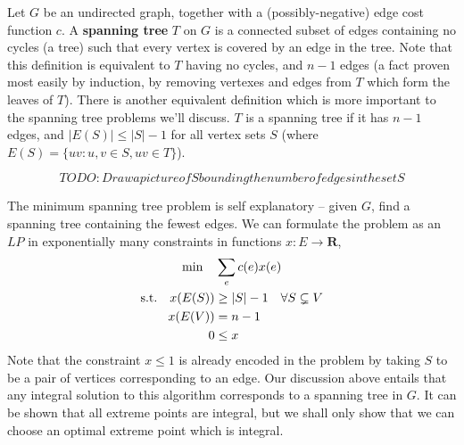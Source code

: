 Let $G$ be an undirected graph, together with a (possibly-negative) edge cost function $c$. A {\bf spanning tree} $T$ on $G$ is a connected subset of edges containing no cycles (a tree) such that every vertex is covered by an edge in the tree. Note that this definition is equivalent to $T$ having no cycles, and $n-1$ edges (a fact proven most easily by induction, by removing vertexes and edges from $T$ which form the leaves of $T$). There is another equivalent definition which is more important to the spanning tree problems we'll discuss. $T$ is a spanning tree if it has $n-1$ edges, and $|E(S)| \leq |S| - 1$ for all vertex sets $S$ (where $E(S) = \{ uv : u,v \in S, uv \in T \}$).

\[ TODO: Draw a picture of S bounding the number of edges in the set S \]

The minimum spanning tree problem is self explanatory -- given $G$, find a spanning tree containing the fewest edges. We can formulate the problem as an $LP$ in exponentially many constraints in functions $x: E \to \mathbf{R}$,
%
\begin{gather*}
\min \quad \sum_e c(e) x(e) \\
\begin{aligned}
\textup{s.t.}\quad x(E(S)) &\geq |S| - 1\ \ \ \forall S \subsetneq V\\
                   x(E(V)) &= n - 1 \\
                   0 &\leq x
\end{aligned}
\end{gather*}
%
Note that the constraint $x \leq 1$ is already encoded in the problem by taking $S$ to be a pair of vertices corresponding to an edge. Our discussion above entails that any integral solution to this algorithm corresponds to a spanning tree in $G$. It can be shown that all extreme points are integral, but we shall only show that we can choose an optimal extreme point which is integral.

